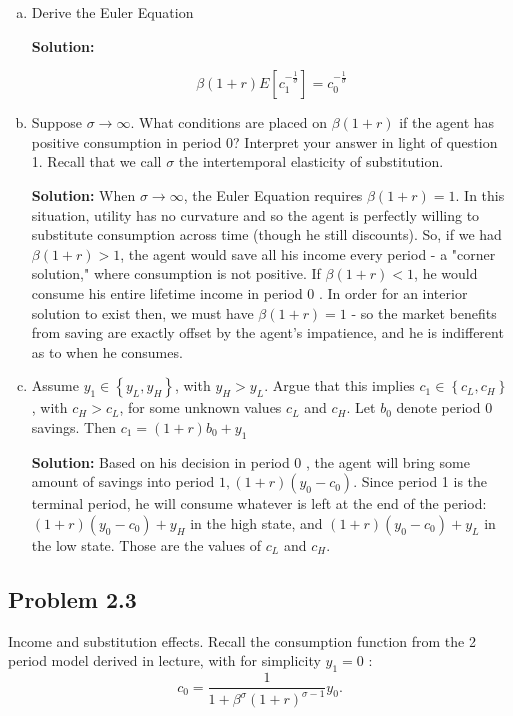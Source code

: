 \documentclass[11pt]{extarticle}
\theoremstyle{plain}
\theoremstyle{definition}
\begin{document}
\begin{enumerate}[(a)]

\item Derive the Euler Equation



\textbf{Solution:} 

$$\beta(1+r) E\left[c_1^{-\frac{1}{\sigma}}\right]=c_0^{-\frac{1}{\sigma}}$$

\item Suppose $\sigma \rightarrow \infty$. What conditions are placed on $\beta(1+r)$ if the agent has positive consumption in period 0? Interpret your answer in light of question 1. Recall that we call $\sigma$ the intertemporal elasticity of substitution.

\textbf{Solution:} When $\sigma \rightarrow \infty$, the Euler Equation requires $\beta(1+r)=1$. In this situation, utility has no curvature and so the agent is perfectly willing to substitute consumption across time (though he still discounts). So, if we had $\beta(1+r)>1$, the agent would save all his income every period - a "corner solution," where consumption is not positive. If $\beta(1+r)<1$, he would consume his entire lifetime income in period 0 . In order for an interior solution to exist then, we must have $\beta(1+r)=1$ - so the market benefits from saving are exactly offset by the agent's impatience, and he is indifferent as to when he consumes.

\item Assume $y_1 \in\left\{y_L, y_H\right\}$, with $y_H>y_L$. Argue that this implies $c_1 \in\left\{c_L, c_H\right\}$, with $c_H>c_L$, for some unknown values $c_L$ and $c_H$. Let $b_0$ denote period 0 savings. Then $c_1=(1+r) b_0+y_1$

\textbf{Solution:}  Based on his decision in period 0 , the agent will bring some amount of savings into period $1,(1+r)\left(y_0-c_0\right)$. Since period 1 is the terminal period, he will consume whatever is left at the end of the period: $(1+r)\left(y_0-c_0\right)+y_H$ in the high state, and $(1+r)\left(y_0-c_0\right)+y_L$ in the low state. Those are the values of $c_L$ and $c_H$.

\end{enumerate}


\subsection*{Problem 2.3}
 Income and substitution effects. Recall the consumption function from the 2 period model derived in lecture, with for simplicity $y_1=0$ :
$$
c_0=\frac{1}{1+\beta^\sigma(1+r)^{\sigma-1}} y_0 .
$$
\end{document}
